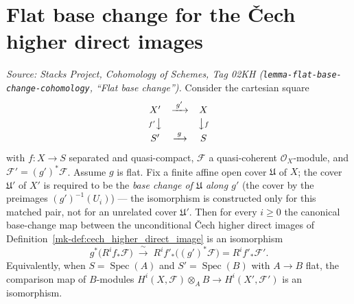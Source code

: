 \section{Flat base change for the {\v C}ech higher direct images}

\begin{lemma}
  \label{mk-lem:cech_flat_base_change}

  \textit{Source: Stacks Project, Cohomology of Schemes, Tag 02KH
  (\texttt{lemma-flat-base-change-cohomology}, ``Flat base change'').}
  Consider the cartesian square
  \[
    \begin{array}{ccc}
      X' & \xrightarrow{\;g'\;} & X \\[2pt]
      {\scriptstyle f'}\big\downarrow & & \big\downarrow{\scriptstyle f} \\[2pt]
      S' & \xrightarrow{\;g\;} & S
    \end{array}
  \]
  with \(f : X \to S\) separated and quasi-compact, \(\mathcal{F}\) a
  quasi-coherent \(\mathcal{O}_X\)-module, and
  \(\mathcal{F}' = (g')^*\mathcal{F}\). Assume \(g\) is flat. Fix a finite affine
  open cover \(\mathfrak{U}\) of \(X\); the cover \(\mathfrak{U}'\) of \(X'\) is
  required to be the \emph{base change of \(\mathfrak{U}\) along \(g'\)} (the cover
  by the preimages \((g')^{-1}(U_i)\)) — the isomorphism is constructed only for
  this matched pair, not for an unrelated cover \(\mathfrak{U}'\). Then for every
  \(i \geq 0\) the canonical base-change map between the unconditional {\v C}ech
  higher direct images of Definition~\ref{mk-def:cech_higher_direct_image} is an
  isomorphism
  \[
    g^*\bigl(R^i f_*\mathcal{F}\bigr) \;\xrightarrow{\;\sim\;}\;
      R^i f'_*\bigl((g')^*\mathcal{F}\bigr) = R^i f'_*\mathcal{F}'.
  \]
  Equivalently, when \(S = \operatorname{Spec}(A)\) and
  \(S' = \operatorname{Spec}(B)\) with \(A \to B\) flat, the comparison map of
  \(B\)-modules \(H^i(X, \mathcal{F}) \otimes_A B \to H^i(X', \mathcal{F}')\) is an
  isomorphism.
\end{lemma}

